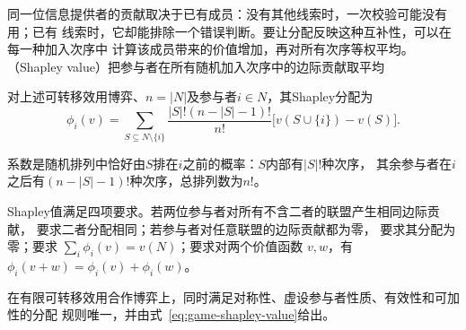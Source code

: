 同一位信息提供者的贡献取决于已有成员：没有其他线索时，一次校验可能没有用；已有
线索时，它却能排除一个错误判断。要让分配反映这种互补性，可以在每一种加入次序中
计算该成员带来的价值增加，再对所有次序等权平均。
（Shapley value）把参与者在所有随机加入次序中的边际贡献取平均
\begin{definition}[Shapley值]
\label{def:game-shapley-value}
对上述可转移效用博弈、\(n=|N|\)及参与者$i\in N$，其Shapley分配为
\begin{equation}
  \phi_i(v)
  =
  \sum_{S\subseteq N\setminus\{i\}}
  \frac{|S|!(n-|S|-1)!}{n!}
  \bigl[
    v(S\cup\{i\})-v(S)
  \bigr].
  \label{eq:game-shapley-value}
\end{equation}
\end{definition}
系数是随机排列中恰好由\(S\)排在\(i\)之前的概率：\(S\)内部有\(|S|!\)种次序，
其余参与者在\(i\)之后有\((n-|S|-1)!\)种次序，总排列数为\(n!\)。

Shapley值满足四项要求。若两位参与者对所有不含二者的联盟产生相同边际贡献，
要求二者分配相同；若参与者对任意联盟的边际贡献都为零，
要求其分配为零；要求
\(\sum_i\phi_i(v)=v(N)\)；要求对两个价值函数
\(v,w\)，有\(\phi_i(v+w)=\phi_i(v)+\phi_i(w)\)。

\begin{theorem}[Shapley值的公理刻画]
\label{thm:game-shapley-characterization}
在有限可转移效用合作博弈上，同时满足对称性、虚设参与者性质、有效性和可加性的分配
规则唯一，并由式~\eqref{eq:game-shapley-value}给出。
\end{theorem}

